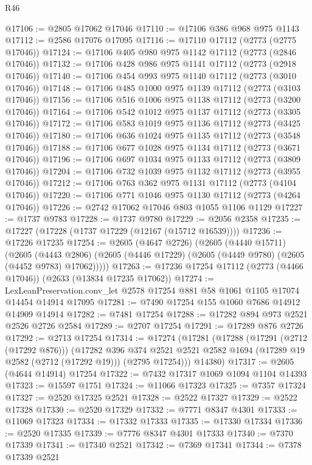\begin{lexlean}{R46}
\begin{coremodule}
@17106 := @2805 @17062 @17046
@17110 := @17106 @386 @968 @975 @1143
@17112 := @2586 @17076 @17095
@17116 := @17110 @17112 (@2773 (@2775 @17046))
@17124 := @17106 @405 @980 @975 @1142 @17112 (@2773 (@2846 @17046))
@17132 := @17106 @428 @986 @975 @1141 @17112 (@2773 (@2918 @17046))
@17140 := @17106 @454 @993 @975 @1140 @17112 (@2773 (@3010 @17046))
@17148 := @17106 @485 @1000 @975 @1139 @17112 (@2773 (@3103 @17046))
@17156 := @17106 @516 @1006 @975 @1138 @17112 (@2773 (@3200 @17046))
@17164 := @17106 @542 @1012 @975 @1137 @17112 (@2773 (@3305 @17046))
@17172 := @17106 @583 @1019 @975 @1136 @17112 (@2773 (@3425 @17046))
@17180 := @17106 @636 @1024 @975 @1135 @17112 (@2773 (@3548 @17046))
@17188 := @17106 @677 @1028 @975 @1134 @17112 (@2773 (@3671 @17046))
@17196 := @17106 @697 @1034 @975 @1133 @17112 (@2773 (@3809 @17046))
@17204 := @17106 @732 @1039 @975 @1132 @17112 (@2773 (@3955 @17046))
@17212 := @17106 @763 @362 @975 @1131 @17112 (@2773 (@4104 @17046))
@17220 := @17106 @771 @1046 @975 @1130 @17112 (@2773 (@4264 @17046))
@17226 := @2742 @17062 @17046 @803 @1055 @1106 @1129
@17227 := @1737 @9783
@17228 := @1737 @9780
@17229 := @2056 @2358
@17235 := @17227 (@17228 (@1737 @17229 (@12167 (@15712 @16539))))
@17236 := @17226 @17235
@17254 := @2605
    (@4647 @2726)
    (@2605
      (@4440 @15711)
      (@2605
        (@4443 @2806)
        (@2605 (@4446 @17229) (@2605 (@4449 @9780) (@2605 (@4452 @9783) @17062)))))
@17263 := @17236 @17254 @17112 (@2773 (@4466 @17046)) (@2633 (@13834 @17235 @17062))
@17274 := LexLeanPreservation.conv_let @2578 @17254 @881 @58 @1061 @1105 @17074 @14454 @14914 @17095
@17281 := @7490 @17254 @155 @1060 @7686 @14912 @14909 @14914
@17282 := @7481 @17254
@17288 := @17282 @894 @973 @2521 @2526 @2726 @2584
@17289 := @2707 @17254
@17291 := @17289 @876 @2726
@17292 := @2713 @17254
@17314 := @17274
    (@17281
      (@17288
        (@17291 (@2712 (@17292 @876)))
        (@17282
          @396
          @374
          @2521
          @2521
          @2582
          @1694
          (@17289 @19 @2582 (@2712 (@17292 @19)))
          (@2795 @17254)))
      @14380)
@17317 := @2605 (@4644 @14914) @17254
@17322 := @7432 @17317 @1069 @1094 @1104 @14393
@17323 := @15597 @1751
@17324 := @11066 @17323
@17325 := @7357 @17324
@17327 := @2520 @17325 @2521
@17328 := @2522 @17327
@17329 := @2522 @17328
@17330 := @2520 @17329
@17332 := @7771 @8347 @4301
@17333 := @11069 @17323
@17334 := @17332 @17333
@17335 := @17330 @17334
@17336 := @2520 @17335
@17339 := @7776 @8347 @4301 @17333
@17340 := @7370 @17339
@17341 := @17340 @2521
@17342 := @7369 @17341
@17344 := @7378 @17339 @2521

\end{coremodule}
\end{lexlean}
